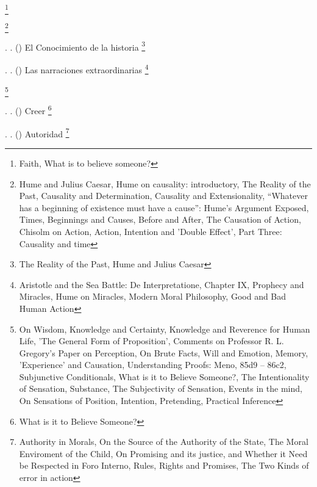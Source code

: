 \documentclass[11pt]{article}
\begin{document}
{\begin{spacing}{1.5}
\tab {}
\footnote{
Faith, 
What is to believe someone?
}



\tab {}
\footnote{
Hume and Julius Caesar, 
Hume on causality: introductory, 
The Reality of the Past, 
Causality and Determination, 
Causality and Extensionality, 
“Whatever has a beginning of existence must have a cause”: Hume's Argument Exposed, 
Times, Beginnings and Causes, 
Before and After, 
The Causation of Action, 
Chisolm on Action, 
Action, Intention and 'Double Effect', 
Part Three: Causality and time
}

\tab \tab \tab {}. 
. 
()
El Conocimiento de la historia
\footnote{
The Reality of the Past, 
Hume and Julius Caesar
}

\tab \tab \tab {}. 
. 
()
Las narraciones extraordinarias
\footnote{
Aristotle and the Sea Battle: De Interpretatione, Chapter IX, 
Prophecy and Miracles, 
Hume on Miracles, 
Modern Moral Philosophy, 
Good and Bad Human Action
}

\tab {}
\footnote{
On Wisdom, 
Knowledge and Certainty, 
Knowledge and Reverence for Human Life, 
'The General Form of Proposition', 
Comments on Professor R. L. Gregory's Paper on Perception, 
On Brute Facts, 
Will and Emotion, 
Memory, 'Experience' and Causation, 
Understanding Proofs: Meno, 85d9 – 86c2, 
Subjunctive Conditionals, 
What is it to Believe Someone?, 
The Intentionality of Sensation, 
Substance, 
The Subjectivity of Sensation, 
Events in the mind, 
On Sensations of Position, 
Intention, 
Pretending, 
Practical Inference
}


\tab \tab \tab {}. 
. 
()
Creer
\footnote{
What is it to Believe Someone?
}

\tab \tab \tab {}. 
. 
()
Autoridad
\footnote{
Authority in Morals, 
On the Source of the Authority of the State, 
The Moral Enviroment of the Child, 
On Promising and its justice, and Whether it Need be Respected in Foro Interno, 
Rules, Rights and Promises, 
The Two Kinds of error in action
}


\end{spacing}}
\end{document}
